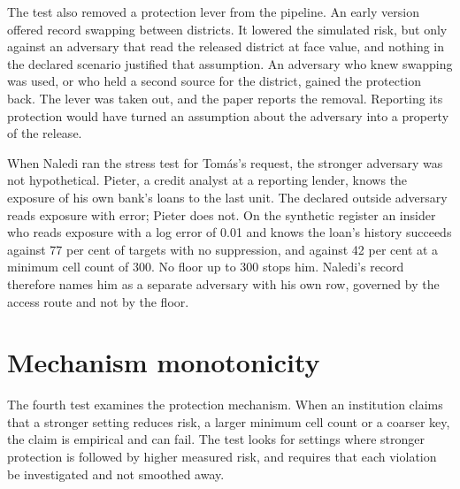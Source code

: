 The test also removed a protection lever from the pipeline. An early version
offered record swapping between districts. It lowered the simulated risk, but only
against an adversary that read the released district at face value, and nothing in
the declared scenario justified that assumption. An adversary who knew swapping
was used, or who held a second source for the district, gained the protection
back. The lever was taken out, and the paper reports the removal. %
Reporting its protection would have turned an assumption about the adversary into
a property of the release.

When Naledi ran the stress test for Tomás's request, the stronger adversary was not
hypothetical. Pieter, a credit analyst at a reporting lender, knows the exposure of
his own bank's loans to the last unit. The declared outside adversary reads
exposure with error; Pieter does not. On the synthetic register an insider who reads
exposure with a log error of 0.01 and knows the loan's history succeeds against
77 per cent of targets with no suppression, and against 42 per cent at a minimum
cell count of 300. %
No floor up to 300 stops him. Naledi's record therefore names him as a separate
adversary with his own row, governed by the access route and not by the floor.

\section{Mechanism monotonicity}

The fourth test examines the protection mechanism. When an institution claims that
a stronger setting reduces risk, a larger minimum cell count or a coarser key, the
claim is empirical and can fail. The test looks for settings where stronger
protection is followed by higher measured risk, and requires that each violation
be investigated and not smoothed away.

